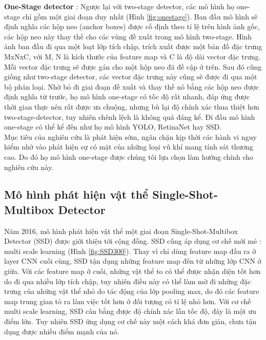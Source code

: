 \documentclass[a4paper]{article}
\begin{document}
\textbf{One-Stage detector} : Ngược lại với two-stage detector, các mô hình họ one-stage chỉ gồm một giai đoạn duy nhất (Hình \ref{fig:onestage}). Ban đầu mô hình sẽ định nghĩa các hộp neo (anchor boxes) được cố định theo tỉ lệ trên hình ảnh gốc, các hộp neo này thay thế cho các vùng đề xuất trong mô hình two-stage. Hình ảnh ban đầu đi qua một loạt lớp tích chập, trích xuất được một bản đồ đặc trưng MxNxC, với M, N là kích thước của feature map và C là độ dài vector đặc trưng. Mỗi vector đặc trưng sẽ được gán cho một hộp neo đã đề cập ở trên. Sau đó cũng giống như two-stage detector, các vector đặc trưng này cũng sẽ được đi qua một bộ phân loại. Nhờ bỏ đi giai đoạn đề xuất và thay thế nó bằng các hộp neo được định nghĩa từ trước, họ mô hình one-stage có tốc độ rất nhanh, đáp ứng được thời gian thực nên rất được ưa chuộng, nhưng bù lại độ chính xác thua thiệt hơn two-stage-detector, tuy nhiên chênh lệch là không quá đáng kể. Đi đầu mô hình one-stage có thể kể đến như họ mô hình YOLO\cite{yolov1, yolov2, yolov3}, RetinaNet\cite{focalloss} hay SSD\cite{ssd}. \\

Mục tiêu của nghiên cứu là phát hiện sớm, ngăn chặn kịp thời các hành vi nguy hiểm nhờ vào phát hiện sự có mặt của những loại vũ khí mang tính sát thương cao. Do đó họ mô hình one-stage được chúng tôi lựa chọn làm hướng chính cho nghiên cứu này.

\subsection{\textbf{Mô hình phát hiện vật thể Single-Shot-Multibox Detector}}

Năm 2016, mô hình phát hiện vật thể một giai đoạn Single-Shot-Multibox Detector (SSD) \cite{ssd} được giới thiệu tới cộng đồng. SSD cũng áp dụng cơ chế mới mẻ : multi scale learning (Hình \ref{fig:SSD300}). Thay vì chỉ dùng feature map đầu ra ở layer CNN cuối cùng, SSD tận dụng những feature map đến từ những lớp CNN ở giữa. Với các feature map ở cuối, những vật thể to có thể được nhận diện tốt hơn do đi qua nhiều lớp tích chập, tuy nhiên điều này có thể làm mờ đi những đặc trưng của những vật thể nhỏ do tác động của lớp pooling max, do đó các feature map trung gian tỏ ra làm việc tốt hơn ở đối tượng có tỉ lệ nhỏ hơn. Với cơ chế multi scale learning, SSD cân bằng được độ chính xác lẫn tốc độ, đây là một ưu điểm lớn. Tuy nhiên SSD ứng dụng cơ chế này một cách khá đơn giản, chưa tận dụng được nhiều điểm mạnh của nó.
\end{document}
